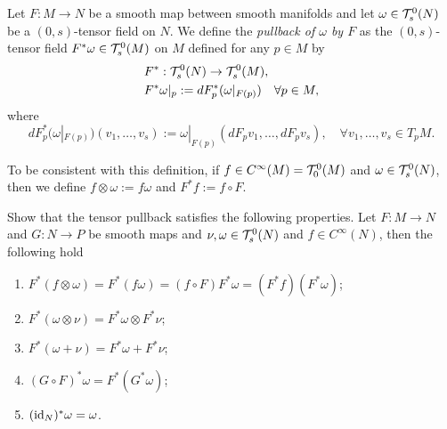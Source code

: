 \begin{definition}\label{def:pullback0s}
  Let $F:M\to N$ be a smooth map between smooth manifolds and let $\omega \in \mathcal{T}_s^0(N)$ be a $(0,s)$-tensor field on $N$. We define the \emph{pullback of $\omega$ by $F$} as the $(0,s)$-tensor field $F^*\omega \in \mathcal{T}_s^0(M)$ on $M$ defined for any $p\in M$ by
  \begin{align}
     & F^* : \mathcal{T}_s^0(N) \to \mathcal{T}_s^0(M),                             \\
     & F^*\omega|_p := dF^*_p(\omega|_{F(p)}) \quad \forall p\in M,
  \end{align}
  where
  \begin{equation}
    dF^*_p(\omega|_{F(p)})(v_1, \ldots, v_s) := \omega|_{F(p)} (dF_p v_1, \ldots, dF_p v_s), \quad\forall v_1, \ldots, v_s \in T_p M.
  \end{equation}
\end{definition}

To be consistent with this definition, if $f\in C^\infty(M) = \mathcal{T}_0^0(M)$ and $\omega \in\mathcal{T}_s^0(N)$, then we define $f\otimes \omega := f\omega$ and $F^* f := f\circ F$.

\begin{exercise}
  Show that the tensor pullback satisfies the following properties.
  Let $F:M\to N$ and $G:N\to P$ be smooth maps and $\nu, \omega \in\mathcal{T}_s^0(N)$ and $f\in C^\infty(N)$, then the following hold
  \begin{enumerate}
    \item $F^*(f\otimes\omega) = F^*(f \omega) = (f\circ F) F^*\omega = (F^* f)(F^*\omega)$;
    \item $F^*(\omega\otimes\nu) = F^*\omega\otimes F^*\nu$;
    \item $F^*(\omega + \nu) = F^*\omega + F^*\nu$;
    \item $(G\circ F)^*\omega = F^*(G^* \omega)$;
    \item $(\operatorname{id}_N)^* \omega = \omega$.
  \end{enumerate}
\end{exercise}


